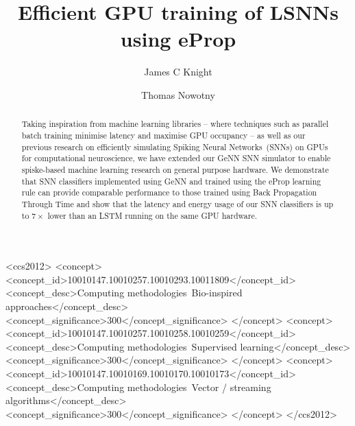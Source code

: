 \documentclass[sigconf,authordraft]{acmart}
\begin{document}
\title{Efficient GPU training of LSNNs using eProp}

\author{James C Knight}

\author{Thomas Nowotny}
\renewcommand{\shortauthors}{Knight and Nowotny}

\begin{abstract}
    Taking inspiration from machine learning libraries -- where techniques such as parallel batch training minimise latency and maximise GPU occupancy -- as well as our previous research on efficiently simulating Spiking Neural Networks~(SNNs) on GPUs for computational neuroscience, we have extended our GeNN SNN simulator to enable spiske-based machine learning research on general purpose hardware.
    We demonstrate that SNN classifiers implemented using GeNN and trained using the eProp learning rule can provide comparable performance to those trained using Back Propagation Through Time and show that the latency and energy usage of our SNN classifiers is up to $7\times$ lower than an LSTM running on the same GPU hardware.
\end{abstract}

\begin{CCSXML}
<ccs2012>
   <concept>
       <concept_id>10010147.10010257.10010293.10011809</concept_id>
       <concept_desc>Computing methodologies~Bio-inspired approaches</concept_desc>
       <concept_significance>300</concept_significance>
       </concept>
   <concept>
       <concept_id>10010147.10010257.10010258.10010259</concept_id>
       <concept_desc>Computing methodologies~Supervised learning</concept_desc>
       <concept_significance>300</concept_significance>
       </concept>
   <concept>
       <concept_id>10010147.10010169.10010170.10010173</concept_id>
       <concept_desc>Computing methodologies~Vector / streaming algorithms</concept_desc>
       <concept_significance>300</concept_significance>
       </concept>
 </ccs2012>
\end{CCSXML}
\end{document}
